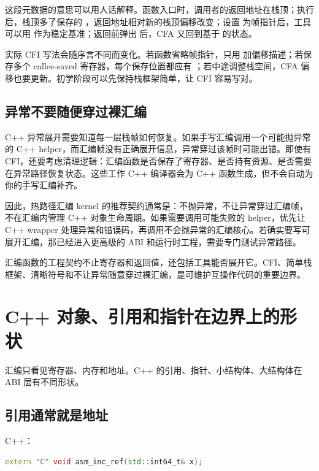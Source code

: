 这段元数据的意思可以用人话解释。函数入口时，调用者的返回地址在栈顶；执行  后，栈顶多了保存的 ，返回地址相对新的栈顶偏移改变；设置  为帧指针后，工具可以用  作为稳定基准；返回前弹出  后，CFA 又回到基于  的状态。

实际 CFI 写法会随序言不同而变化。若函数省略帧指针，只用  加偏移描述；若保存多个 callee-saved 寄存器，每个保存位置都应有 ；若中途调整栈空间，CFA 偏移也要更新。初学阶段可以先保持栈框架简单，让 CFI 容易写对。

\subsection{异常不要随便穿过裸汇编}

C++ 异常展开需要知道每一层栈帧如何恢复。如果手写汇编调用一个可能抛异常的 C++ helper，而汇编帧没有正确展开信息，异常穿过该帧时可能出错。即使有 CFI，还要考虑清理逻辑：汇编函数是否保存了寄存器、是否持有资源、是否需要在异常路径恢复状态。这些工作 C++ 编译器会为 C++ 函数生成，但不会自动为你的手写汇编补齐。

因此，热路径汇编 kernel 的推荐契约通常是：不抛异常，不让异常穿过汇编帧，不在汇编内管理 C++ 对象生命周期。如果需要调用可能失败的 helper，优先让 C++ wrapper 处理异常和错误码，再调用不会抛异常的汇编核心。若确实要写可展开汇编，那已经进入更高级的 ABI 和运行时工程，需要专门测试异常路径。

\begin{keyidea}
汇编函数的工程契约不止寄存器和返回值，还包括工具能否展开它。CFI、简单栈框架、清晰符号和不让异常随意穿过裸汇编，是可维护互操作代码的重要边界。
\end{keyidea}

\section{C++ 对象、引用和指针在边界上的形状}

汇编只看见寄存器、内存和地址。C++ 的引用、指针、小结构体、大结构体在 ABI 层有不同形状。

\subsection{引用通常就是地址}

C++：

\begin{lstlisting}[language=C++]
extern "C" void asm_inc_ref(std::int64_t& x);
\end{lstlisting}

